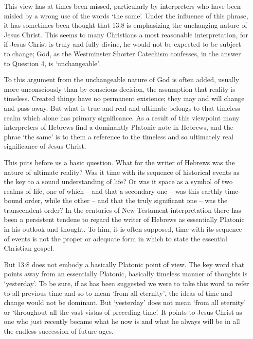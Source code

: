 This view has at times been missed, particularly by interpreters who have been
misled by a wrong use of the words `the same'.
Under the influence of this phrase, it has sometimes been thought that 13:8 is
emphasizing the unchanging nature of Jesus Christ.
This seems to many Christians a most reasonable interpretation, for if Jesus
Christ is truly and fully divine, he would not be expected to be subject to
change; God, as the Westminster Shorter Catechism confesses, in the answer to
Question 4, is `unchangeable'.
\newline

To this argument from the unchangeable nature of God is often added, usually
more unconsciously than by conscious decision, the assumption that reality is
timeless.
Created things have no permanent existence; they may and will change and pass
away.
But what is true and real and ultimate belongs to that timeless realm which
alone has primary significance.
As a result of this viewpoint many interpreters of Hebrews find a dominantly
Platonic note in Hebrews, and the phrae `the same' is to them a reference to the
timeless and so ultimately real significance of Jesus Christ.
\newline

This puts before us a basic question.
What for the writer of Hebrews was the nature of ultimate reality?
Was it time with its sequence of historical events as the key to a sound
understanding of life?
Or was it space as a symbol of two realms of life, one of which -- and that a
secondary one -- was this earthly time-bound order, while the other -- and that
the truly significant one -- was the transcendent order?
In the centuries of New Testament interpretation there has been a persistent
tendene to regard the writer of Hebrews as essentially Platonic in his outlook
and thought.
To him, it is often supposed, time with its sequence of events is not the proper
or adequate form in which to state the essential Christian gospel.
\newline

But 13:8 does not embody a basically Platonic point of view.
The key word that points away from an essentially Platonic, basically timeless
manner of thoughts is `yesterday'.
To be sure, if as has been suggested we were to take this word to refer to all
previous time and so to mean `from all eternity', the ideas of time and change
would not be dominant.
But `yesterday' does not mean `from all eternity' or `throughout all the vast
vistas of preceding time'.
It points to Jesus Christ as one who just recently became what he now is and
what he always will be in all the endless succession of future ages.
\newline

